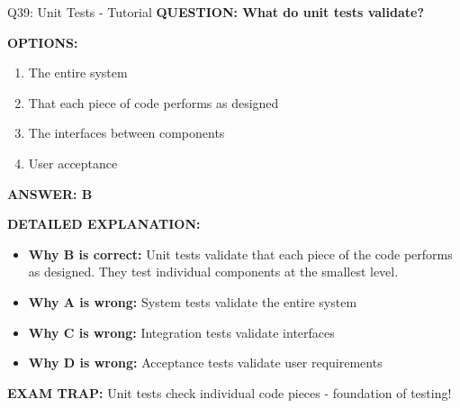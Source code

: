 \documentclass[8pt]{beamer}
\begin{document}
	\begin{frame}{Q39: Unit Tests - Tutorial}
		\fontsize{6.5}{7.5}\selectfont
		\textbf{QUESTION: What do unit tests validate?}
		
		\vspace{0.1cm}
		\textbf{OPTIONS:}
		\begin{enumerate}
			\item The entire system
			\item That each piece of code performs as designed
			\item The interfaces between components
			\item User acceptance
		\end{enumerate}
		
		\vspace{0.1cm}
		\textcolor{myblue}{\textbf{ANSWER: B}}
		
		\vspace{0.1cm}
		\textbf{DETAILED EXPLANATION:}
		\begin{itemize}
			\item \textbf{Why B is correct:} Unit tests validate that each piece of the code performs as designed. They test individual components at the smallest level.
			\item \textbf{Why A is wrong:} System tests validate the entire system
			\item \textbf{Why C is wrong:} Integration tests validate interfaces
			\item \textbf{Why D is wrong:} Acceptance tests validate user requirements
		\end{itemize}
		
		\textcolor{myred}{\textbf{EXAM TRAP:}} Unit tests check \textcolor{myblue}{individual code pieces} - foundation of testing!
	\end{frame}
	
\end{document}
